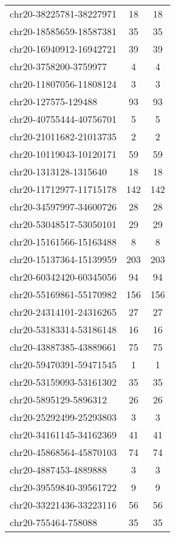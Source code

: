 \documentclass[10pt,letterpaper]{article}
\begin{document}
{\begin{longtable}{lSS}
	chr20-38225781-38227971 & 18     & 18       \\
	chr20-18585659-18587381 & 35     & 35       \\
	chr20-16940912-16942721 & 39     & 39       \\
	chr20-3758200-3759977   & 4      & 4        \\
	chr20-11807056-11808124 & 3      & 3        \\
	chr20-127575-129488     & 93     & 93       \\
	chr20-40755444-40756701 & 5      & 5        \\
	chr20-21011682-21013735 & 2      & 2        \\
	chr20-10119043-10120171 & 59     & 59       \\
	chr20-1313128-1315640   & 18     & 18       \\
	chr20-11712977-11715178 & 142    & 142      \\
	chr20-34597997-34600726 & 28     & 28       \\
	chr20-53048517-53050101 & 29     & 29       \\
	chr20-15161566-15163488 & 8      & 8        \\
	chr20-15137364-15139959 & 203    & 203      \\
	chr20-60342420-60345056 & 94     & 94       \\
	chr20-55169861-55170982 & 156    & 156      \\
	chr20-24314101-24316265 & 27     & 27       \\
	chr20-53183314-53186148 & 16     & 16       \\
	chr20-43887385-43889661 & 75     & 75       \\
	chr20-59470391-59471545 & 1      & 1        \\
	chr20-53159093-53161302 & 35     & 35       \\
	chr20-5895129-5896312   & 26     & 26       \\
	chr20-25292499-25293803 & 3      & 3        \\
	chr20-34161145-34162369 & 41     & 41       \\
	chr20-45868564-45870103 & 74     & 74       \\
	chr20-4887453-4889888   & 3      & 3        \\
	chr20-39559840-39561722 & 9      & 9        \\
	chr20-33221436-33223116 & 56     & 56       \\
	chr20-755464-758088     & 35     & 35       \\

\end{longtable}}
\end{document}
